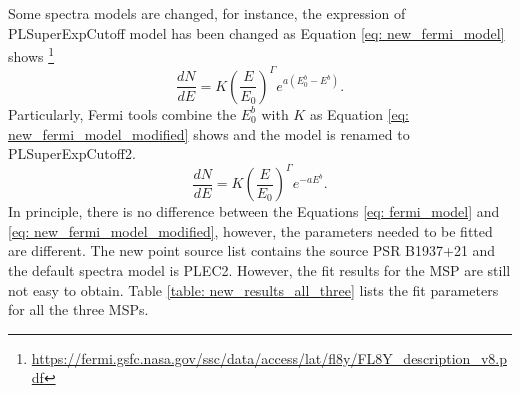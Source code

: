 \documentclass[a4paper, 12pt]{report}
\newcommand{\mycaption}[1]{\protect \caption{#1}}
\begin{document}
    Some spectra models are changed, for instance, the expression of PLSuperExpCutoff model 
    has been changed as Equation \ref{eq: new_fermi_model} shows \footnote[1]%
    {\url{https://fermi.gsfc.nasa.gov/ssc/data/access/lat/fl8y/FL8Y_description_v8.pdf}}%
    \begin{equation}
      \frac{dN}{dE} = K\left(\frac{E}{E_0}\right)^{\Gamma} e^{a\left(E_0^b-E^b\right)} . 
      \label{eq: new_fermi_model}
    \end{equation}
    Particularly, Fermi tools combine the $E_0^b$ with $K$ as Equation 
    \ref{eq: new_fermi_model_modified} shows and the model is renamed to PLSuperExpCutoff2. 
    \begin{equation}
      \frac{dN}{dE} = K\left(\frac{E}{E_0}\right)^{\Gamma} e^{-aE^b} .
      \label{eq: new_fermi_model_modified}
    \end{equation}
    In principle, there is no difference between the Equations \ref{eq: fermi_model} and 
    \ref{eq: new_fermi_model_modified}, however, the parameters needed to be fitted are 
    different. The new point source list contains the source PSR B1937+21 and the default 
    spectra model is PLEC2. However, the fit results for the MSP are still not easy 
    to obtain. Table \ref{table: new_results_all_three} lists the fit parameters for all 
    the three MSPs.
\end{document}

